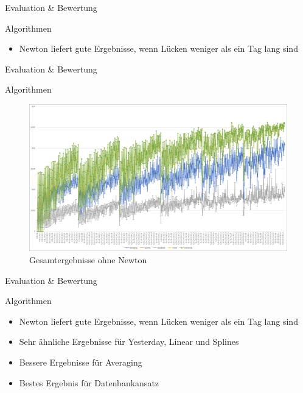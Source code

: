 \begin{frame}{Evaluation \& Bewertung}
\begin{block}{Algorithmen}
\begin{itemize}
	\item Newton liefert gute Ergebnisse, wenn Lücken weniger als ein Tag lang sind
\end{itemize}
\end{block}
\end{frame}

\begin{frame}{Evaluation \& Bewertung}
\begin{block}{Algorithmen}
\begin{figure}
	\centering
	\includegraphics[width=1\textwidth]{pics/evaluation-algorithms-2.png}
	\caption{Gesamtergebnisse ohne Newton}
\end{figure}
\end{block}
\end{frame}

\begin{frame}{Evaluation \& Bewertung}
\begin{block}{Algorithmen}
\begin{itemize}
	\item Newton liefert gute Ergebnisse, wenn Lücken weniger als ein Tag lang sind
	\item Sehr ähnliche Ergebnisse für Yesterday, Linear und Splines
	\item Bessere Ergebnisse für Averaging
	\item Bestes Ergebnis für Datenbankansatz
\end{itemize}
\end{block}
\end{frame}


